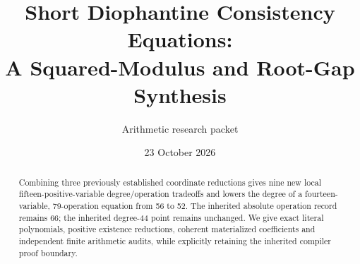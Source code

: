 \documentclass[11pt]{article}
\title{Short Diophantine Consistency Equations:\\A Squared-Modulus and Root-Gap Synthesis}
\author{Arithmetic research packet}
\date{23 October 2026}
\begin{document}
\maketitle
\begin{abstract}
Combining three previously established coordinate reductions gives nine
new local fifteen-positive-variable degree/operation tradeoffs and lowers
the degree of a fourteen-variable, 79-operation equation from 56 to 52.
The inherited absolute operation record remains 66; the inherited degree-44
point remains unchanged. We give exact literal polynomials, positive
existence reductions, coherent materialized coefficients and independent
finite arithmetic audits, while explicitly retaining the inherited
compiler proof boundary.
\end{abstract}

\end{document}
